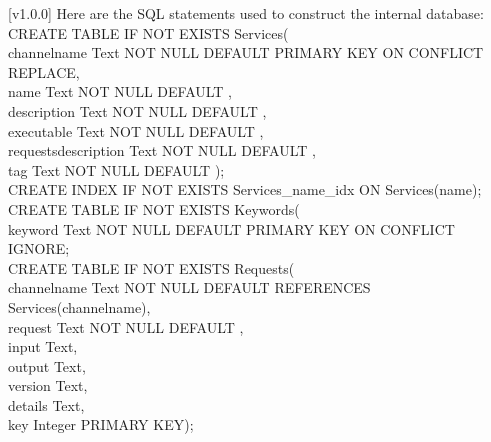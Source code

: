 [v1.0.0]
%
Here are the SQL statements used to construct the internal database:
\outputBegin{}
\settowidth{\utilLen}{CREATE }%
CREATE TABLE IF NOT EXISTS Services(\\
\hspace*{\utilLen}channelname Text NOT NULL DEFAULT \fatUnderscore{} PRIMARY KEY ON CONFLICT REPLACE,\\
\hspace*{\utilLen}name Text NOT NULL DEFAULT \fatUnderscore,\\
\hspace*{\utilLen}description Text NOT NULL DEFAULT \fatUnderscore,\\
\hspace*{\utilLen}executable Text NOT NULL DEFAULT \fatUnderscore,\\
\hspace*{\utilLen}requestsdescription Text NOT NULL DEFAULT \fatUnderscore,\\
\hspace*{\utilLen}tag Text NOT NULL DEFAULT  \fatUnderscore);\\
CREATE INDEX IF NOT EXISTS Services\_name\_idx ON Services(name);\\
CREATE TABLE IF NOT EXISTS Keywords(\\
\hspace*{\utilLen}keyword Text NOT NULL DEFAULT \fatUnderscore{} PRIMARY KEY ON CONFLICT IGNORE;\\
CREATE TABLE IF NOT EXISTS Requests(\\
\hspace*{\utilLen}channelname Text NOT NULL DEFAULT \fatUnderscore{} REFERENCES Services(channelname),\\
\hspace*{\utilLen}request Text NOT NULL DEFAULT \fatUnderscore,\\
\hspace*{\utilLen}input Text,\\
\hspace*{\utilLen}output Text,\\
\hspace*{\utilLen}version Text,\\
\hspace*{\utilLen}details Text,\\
\hspace*{\utilLen}key Integer PRIMARY KEY);\\
